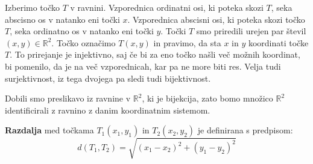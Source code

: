 \documentclass[12pt]{article}
\begin{document}
    {
    \begin{figure}[h]
    \end{figure}
    Izberimo točko \(T\) v ravnini. Vzporednica ordinatni osi, ki poteka skozi \(T\), seka abscisno os v natanko eni
    točki \(x\). Vzporednica abscisni osi, ki poteka skozi točko \(T\), seka ordinatno os v natanko eni točki \(y\).
    Točki \(T\) smo priredili urejen par števil \(\left(x, y\right) \in \mathbb{R}^2\). Točko označimo \(T\left(x, y\right)\)
    in pravimo, da sta \(x\) in \(y\) koordinati točke \(T\). To prirejanje je injektivno, saj če bi za eno točko našli
    več možnih koordinat, bi pomenilo, da je na več vzporednicah, kar pa ne more biti res. Velja tudi surjektivnost,
    iz tega dvojega pa sledi tudi bijektivnost.
    }

    Dobili smo preslikavo iz ravnine v \(\mathbb{R}^2\), ki je bijekcija, zato bomo množico \(\mathbb{R}^2\) identificirali
    z ravnino z danim koordinatnim sistemom.

    \begin{figure}[h]
    \end{figure}
    \textbf{Razdalja} med točkama \(T_1\left(x_1, y_1\right)\) in \(T_2\left(x_2, y_2\right)\) je definirana s predpisom:
    \[d\left(T_1, T_2\right) = \sqrt{\left(x_1 - x_2\right) ^ 2 + \left(y_1 - y_2\right)^2}\]
\end{document}
